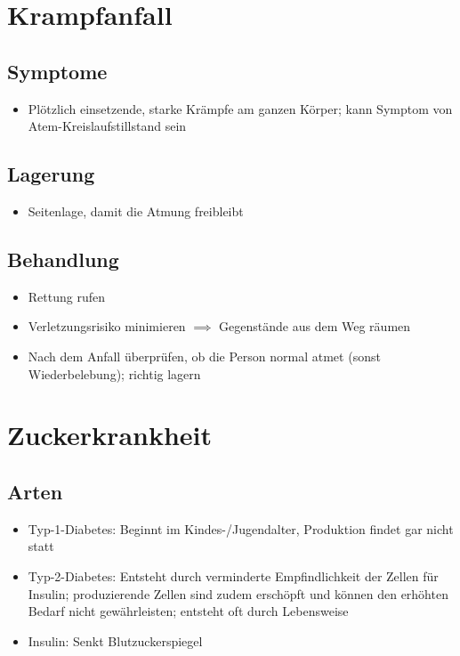 \chapter{Krampfanfall}

\section*{Symptome}
\begin{itemize}
    \item Plötzlich einsetzende, starke Krämpfe am ganzen Körper; kann Symptom von Atem-Kreislaufstillstand sein
\end{itemize}

\section*{Lagerung}
\begin{itemize}
    \item Seitenlage, damit die Atmung freibleibt
\end{itemize}

\section*{Behandlung}
\begin{itemize}
    \item Rettung rufen
    \item Verletzungsrisiko minimieren $\implies$ Gegenstände aus dem Weg räumen
    \item Nach dem Anfall überprüfen, ob die Person normal atmet (sonst Wiederbelebung); richtig lagern
\end{itemize}

\chapter{Zuckerkrankheit}
\section*{Arten}
\begin{itemize}
    \item Typ-1-Diabetes:  Beginnt im Kindes-/Jugendalter, Produktion findet gar nicht statt
    \item Typ-2-Diabetes: Entsteht durch verminderte Empfindlichkeit der Zellen für Insulin; produzierende Zellen sind zudem erschöpft und können den erhöhten Bedarf nicht gewährleisten; entsteht oft durch Lebensweise
    \item Insulin: Senkt Blutzuckerspiegel
\end{itemize}

